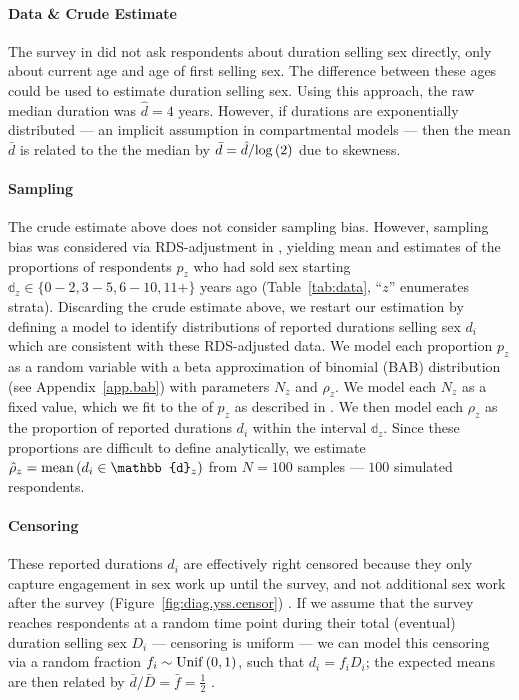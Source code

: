 \paragraph{Data \& Crude Estimate}
The survey in \cite{Baral2014} did not ask respondents about duration selling sex directly,
only about current age and age of first selling sex.
The difference between these ages could be used to estimate duration selling sex.
Using this approach, the raw median duration was $\hat{d} = 4$ years.
However, if durations are exponentially distributed
--- an implicit assumption in compartmental models \cite{Anderson1991} ---
then the mean $\bar{d}$ is related to the the median by
$\bar{d} = \hat{d}/\mathrm{log}\,(2)$ due to skewness.
\pagebreak %
\paragraph{Sampling}
The crude estimate above does not consider sampling bias.
However, sampling bias was considered via RDS-adjustment in \cite{Baral2014},
yielding mean and \ci estimates of the proportions of respondents $p_z$
who had sold sex starting $\mathbb{d}_z \in \{0{-}2, 3{-}5, 6{-}10, 11+\}$ years ago
(Table~\ref{tab:data}, ``$z$'' enumerates strata).
Discarding the crude estimate above,
we restart our estimation by defining a model to identify
distributions of reported durations selling sex $d_i$
which are consistent with these RDS-adjusted data.
We model each proportion $p_z$ as a random variable with
a beta approximation of binomial (BAB) distribution (see Appendix~\ref{app.bab})
with parameters $N_z$ and $\rho_z$.
We model each $N_z$ as a fixed value,
which we fit to the \ci of $p_z$ as described in .
We then model each $\rho_z$ as
the proportion of reported durations $d_i$ within the interval $\mathbb{d}_z$.
Since these proportions are difficult to define analytically,
we estimate $\hat{\rho}_z = \distr{mean}{d_i \in \mathbb{d}_z}$
from $N = 100$ samples --- \ie $100$ simulated respondents.
\paragraph{Censoring}
These reported durations $d_i$ are effectively right censored
because they only capture engagement in sex work up until the survey,
and not additional sex work after the survey
(Figure~\ref{fig:diag.yss.censor}) \cite{Fazito2012}.
If we assume that the survey reaches respondents at a random time point
during their total (eventual) duration selling sex $D_i$
--- \ie censoring is uniform --- we can model this censoring via
a random fraction $f_i \sim \mathrm{Unif}\,(0,1)$, such that $d_i = f_i D_i$;
the expected means are then related by $\bar{d} / \bar{D} = \bar{f} = \frac12$ \cite{Tufto2017}.
